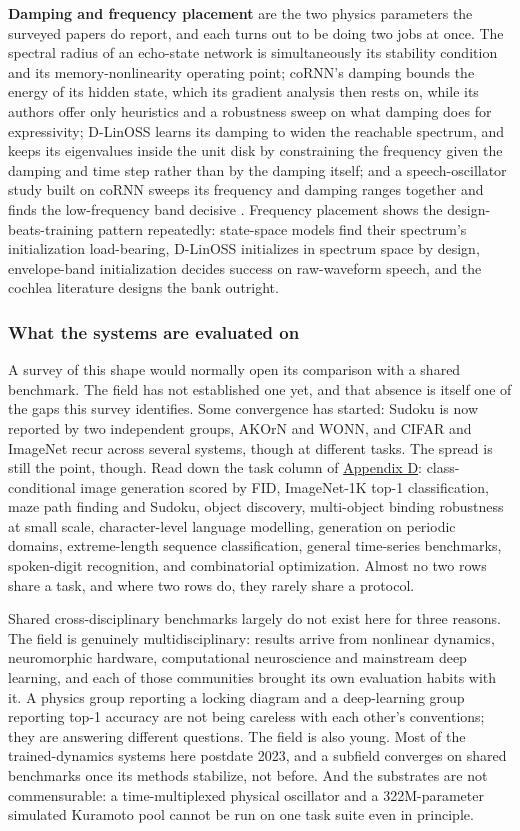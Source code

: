 \documentclass[10pt]{article}
\begin{document}
\textbf{Damping and frequency placement} are the two physics parameters
the surveyed papers do report, and each turns out to be doing two jobs
at once. The spectral radius of an echo-state network is simultaneously
its stability condition and its memory-nonlinearity operating point;
coRNN's damping bounds the energy of its hidden state, which its
gradient analysis then rests on, while its authors offer only heuristics
and a robustness sweep on what damping does for expressivity; D-LinOSS
learns its damping to widen the reachable spectrum, and keeps its
eigenvalues inside the unit disk by constraining the frequency given the
damping and time step rather than by the damping itself; and a
speech-oscillator study built on coRNN sweeps its frequency and damping
ranges together and finds the low-frequency band decisive
\citep{chandravadia2026}. Frequency placement shows the
design-beats-training pattern repeatedly: state-space models find their
spectrum's initialization load-bearing, D-LinOSS initializes in spectrum
space by design, envelope-band initialization decides success on
raw-waveform speech, and the cochlea literature designs the bank
outright.

\subsubsection{What the systems are evaluated on}\label{sec-2-3-2}

A survey of this shape would normally open its comparison with a shared
benchmark. The field has not established one yet, and that absence is
itself one of the gaps this survey identifies. Some convergence has
started: Sudoku is now reported by two independent groups, AKOrN and
WONN, and CIFAR and ImageNet recur across several systems, though at
different tasks. The spread is still the point, though. Read down the
task column of \hyperref[sec-D]{Appendix D}: class-conditional image
generation scored by FID, ImageNet-1K top-1 classification, maze path
finding and Sudoku, object discovery, multi-object binding robustness at
small scale, character-level language modelling, generation on periodic
domains, extreme-length sequence classification, general time-series
benchmarks, spoken-digit recognition, and combinatorial optimization.
Almost no two rows share a task, and where two rows do, they rarely
share a protocol.

Shared cross-disciplinary benchmarks largely do not exist here for three
reasons. The field is genuinely multidisciplinary: results arrive from
nonlinear dynamics, neuromorphic hardware, computational neuroscience
and mainstream deep learning, and each of those communities brought its
own evaluation habits with it. A physics group reporting a locking
diagram and a deep-learning group reporting top-1 accuracy are not being
careless with each other's conventions; they are answering different
questions. The field is also young. Most of the trained-dynamics systems
here postdate 2023, and a subfield converges on shared benchmarks once
its methods stabilize, not before. And the substrates are not
commensurable: a time-multiplexed physical oscillator and a
322M-parameter simulated Kuramoto pool cannot be run on one task suite
even in principle.
\end{document}
